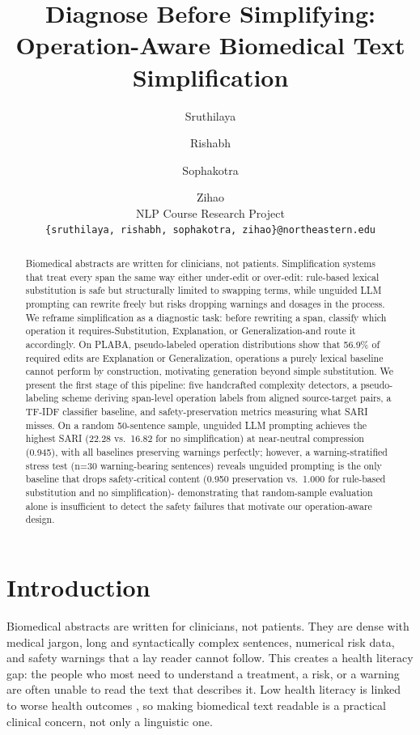 \documentclass[11pt]{article}
\title{Diagnose Before Simplifying: Operation-Aware Biomedical Text Simplification}
\author{Sruthilaya \and Rishabh \and Sophakotra \and Zihao \\
  NLP Course Research Project \\
  \texttt{\{sruthilaya, rishabh, sophakotra, zihao\}@northeastern.edu}}
\begin{document}
\maketitle

\begin{abstract}
Biomedical abstracts are written for clinicians, not patients.
Simplification systems that treat every span the same way either
under-edit or over-edit: rule-based lexical substitution is safe but
structurally limited to swapping terms, while unguided LLM prompting can
rewrite freely but risks dropping warnings and dosages in the process. We
reframe simplification as a diagnostic task: before rewriting a span,
classify which operation it requires-Substitution, Explanation, or
Generalization-and route it accordingly. On PLABA, pseudo-labeled
operation distributions show that 56.9\% of required edits are Explanation
or Generalization, operations a purely lexical baseline cannot perform by
construction, motivating generation beyond simple substitution. We present
the first stage of this pipeline: five handcrafted complexity detectors, a
pseudo-labeling scheme deriving span-level operation labels from aligned
source-target pairs, a TF-IDF classifier baseline, and safety-preservation
metrics measuring what SARI misses. On a random 50-sentence sample,
unguided LLM prompting achieves the highest SARI (22.28 vs.\ 16.82 for no
simplification) at near-neutral compression (0.945), with all baselines
preserving warnings perfectly; however, a warning-stratified stress test
(n=30 warning-bearing sentences) reveals unguided prompting is the only
baseline that drops safety-critical content (0.950 preservation vs.\
1.000 for rule-based substitution and no simplification)- demonstrating
that random-sample evaluation alone is insufficient to detect the safety
failures that motivate our operation-aware design.
\end{abstract}

\section{Introduction}

Biomedical abstracts are written for clinicians, not patients. They are dense
with medical jargon, long and syntactically complex sentences, numerical risk
data, and safety warnings that a lay reader cannot follow. This creates a
health literacy gap: the people who most need to understand a treatment, a
risk, or a warning are often unable to read the text that describes it. Low
health literacy is linked to worse health outcomes \citep{berkman2011health},
so making biomedical text readable is a practical clinical concern, not only
a linguistic one.
\end{document}
